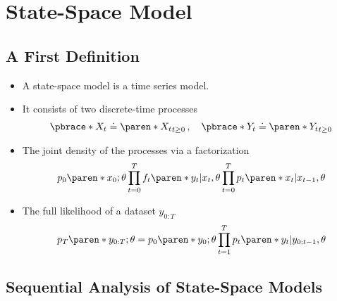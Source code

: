 \section{State-Space Model}

\subsection{A First Definition}

\begin{itemize}
    \item A state-space model is a time series model.
    \item It consists of two discrete-time processes
    \begin{equation}
        \pbrace*{X_{t}} \doteq \paren*{X_{t}}_{t \geq 0}
        \,, \quad
        \pbrace*{Y_{t}} \doteq \paren*{Y_{t}}_{t \geq 0}
    \end{equation}
    \item The joint density of the processes via a factorization
    \begin{equation}
        p_{0} \paren*{x_{0}; \theta}
        \prod_{t = 0}^{T} f_{t} \paren*{ y_{t} \vert x_{t} , \theta}
        \prod_{t = 0}^{T} p_{t} \paren*{ x_{t} \vert x_{t-1} , \theta}
    \end{equation}
    \item The full likelihood of a dataset $y_{0:T}$
    \begin{equation}
        p_{T} \paren*{y_{0:T}; \theta} =
        p_{0} \paren*{ y_{0}; \theta}
        \prod_{t = 1}^{T} p_{t} \paren*{ y_{t} \vert y_{0:t-1} , \theta}
    \end{equation}
\end{itemize}

\subsection{Sequential Analysis of State-Space Models}

